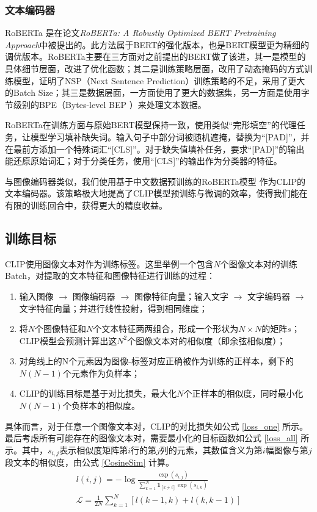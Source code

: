 \documentclass[a4paper]{zreport}
\begin{document}
\subsubsection{文本编码器}

RoBERTa \cite{roberta} 是在论文\emph{RoBERTa: A Robustly Optimized BERT Pretraining Approach}中被提出的。此方法属于BERT的强化版本，也是BERT模型更为精细的调优版本。RoBERTa主要在三方面对之前提出的BERT做了该进，其一是模型的具体细节层面，改进了优化函数；其二是训练策略层面，改用了动态掩码的方式训练模型，证明了NSP（Next Sentence Prediction）训练策略的不足，采用了更大的Batch Size；其三是数据层面，一方面使用了更大的数据集，另一方面是使用字节级别的BPE（Bytes-level BEP ）来处理文本数据。

RoBERTa在训练方面与原始BERT模型保持一致，使用类似“完形填空”的代理任务，让模型学习填补缺失词。输入句子中部分词被随机遮掩，替换为“[PAD]”，并在最前方添加一个特殊词汇“[CLS]”。对于缺失值填补任务，要求“[PAD]”的输出能还原原始词汇；对于分类任务，使用“[CLS]”的输出作为分类器的特征。

与图像编码器类似，我们使用基于中文数据预训练的RoBERTa模型 \cite{cn-roberta} 作为CLIP的文本编码器。该策略极大地提高了CLIP模型预训练与微调的效率，使得我们能在有限的训练回合中，获得更大的精度收益。


\subsection{训练目标}

CLIP使用图像文本对作为训练标签。这里举例一个包含$N$个图像文本对的训练Batch，对提取的文本特征和图像特征进行训练的过程：

\begin{enumerate}
\item 输入图像 $\rightarrow$ 图像编码器 $\rightarrow$ 图像特征向量；输入文字 $\rightarrow$ 文字编码器 $\rightarrow$ 文字特征向量；并进行线性投射，得到相同维度；
\item 将$N$个图像特征和$N$个文本特征两两组合，形成一个形状为$N \times N$的矩阵$s$；
CLIP模型会预测计算出这$N^2$个图像文本对的相似度（即余弦相似度）；
\item 对角线上的N个元素因为图像-标签对应正确被作为训练的正样本，剩下的$N(N-1)$个元素作为负样本；
\item CLIP的训练目标是基于对比损失，最大化$N$个正样本的相似度，同时最小化$N(N-1)$个负样本的相似度。
\end{enumerate}

具体而言，对于任意一个图像文本对，CLIP的对比损失如公式 \eqref{loss_one} 所示。最后考虑所有可能存在的图像文本对，需要最小化的目标函数如公式 \eqref{loss_all} 所示。其中，$s_{i,j}$表示相似度矩阵第$i$行的第$j$列的元素，其数值含义为第$i$幅图像与第$j$段文本的相似度，由公式 \eqref{CosineSim} 计算。
\begin{gather}
l(i,j)=-\log\frac{\exp(s_{i,j})}{\sum_{k=1}^{N} \mathbf{1}_{\left[k \ne i\right]} \exp(s_{i,k})}\label{loss_one}\\
\mathcal{L}=\frac{1}{2N}\sum_{k=1}^N[l(k-1,k)+l(k,k-1)]\label{loss_all}
\end{gather}
\end{document}

